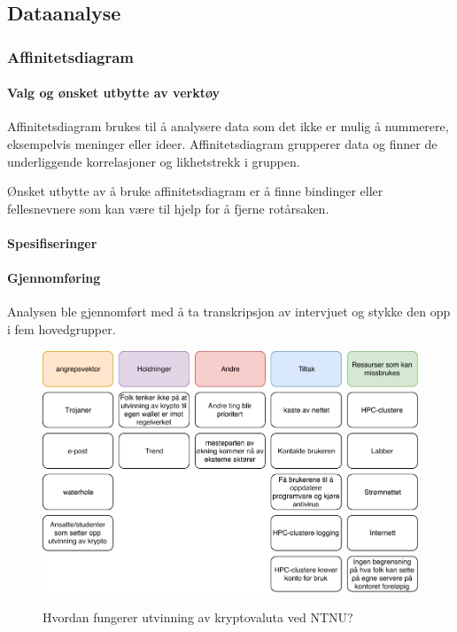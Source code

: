 \subsection{Dataanalyse}
\subsubsection{Affinitetsdiagram}

\paragraph{Valg og ønsket utbytte av verktøy}
Affinitetsdiagram brukes til å analysere data som det ikke er mulig å nummerere, eksempelvis meninger eller ideer. Affinitetsdiagram grupperer data og finner de underliggende korrelasjoner og likhetstrekk i gruppen.

Ønsket utbytte av å bruke affinitetsdiagram er å finne bindinger eller fellesnevnere som kan være til hjelp for å fjerne rotårsaken.

\paragraph{Spesifiseringer}


\paragraph{Gjennomføring}
Analysen ble gjennomført med å ta transkripsjon av intervjuet og stykke den opp i fem hovedgrupper.     

\begin{figure}[H]
    \centering
    \includegraphics[scale=0.6]{case_3/bilder/AD.pdf}
    \label{fig:AD_miner}
    \caption[Analyse av intervju]{Hvordan fungerer utvinning av kryptovaluta ved NTNU?}
\end{figure}

